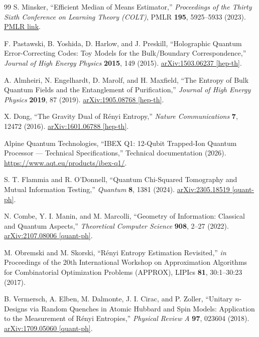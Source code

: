 \documentclass[12pt,a4paper,oneside]{book}
\theoremstyle{plain}
\theoremstyle{definition}
\theoremstyle{remark}
\begin{document}
\begin{thebibliography}{99}
S. Minsker,
``Efficient Median of Means Estimator,''
\emph{Proceedings of the Thirty Sixth Conference on Learning Theory (COLT)}, PMLR \textbf{195}, 5925--5933 (2023).
\href{https://proceedings.mlr.press/v195/minsker23a.html}{PMLR link}.

F. Pastawski, B. Yoshida, D. Harlow, and J. Preskill,
``Holographic Quantum Error-Correcting Codes: Toy Models for the Bulk/Boundary Correspondence,''
\emph{Journal of High Energy Physics} \textbf{2015}, 149 (2015).
\href{https://arxiv.org/abs/1503.06237}{arXiv:1503.06237 [hep-th]}.

A. Almheiri, N. Engelhardt, D. Marolf, and H. Maxfield,
``The Entropy of Bulk Quantum Fields and the Entanglement of Purification,''
\emph{Journal of High Energy Physics} \textbf{2019}, 87 (2019).
\href{https://arxiv.org/abs/1905.08768}{arXiv:1905.08768 [hep-th]}.

X. Dong,
``The Gravity Dual of R\'enyi Entropy,''
\emph{Nature Communications} \textbf{7}, 12472 (2016).
\href{https://arxiv.org/abs/1601.06788}{arXiv:1601.06788 [hep-th]}.

Alpine Quantum Technologies,
``IBEX Q1: 12-Qubit Trapped-Ion Quantum Processor --- Technical Specifications,''
Technical documentation (2026).
\url{https://www.aqt.eu/products/ibex-q1/}.

S. T. Flammia and R. O'Donnell,
``Quantum Chi-Squared Tomography and Mutual Information Testing,''
\emph{Quantum} \textbf{8}, 1381 (2024).
\href{https://arxiv.org/abs/2305.18519}{arXiv:2305.18519 [quant-ph]}.

N. Combe, Y. I. Manin, and M. Marcolli,
``Geometry of Information: Classical and Quantum Aspects,''
\emph{Theoretical Computer Science} \textbf{908}, 2--27 (2022).
\href{https://arxiv.org/abs/2107.08006}{arXiv:2107.08006 [quant-ph]}.

M. Obremski and M. Skorski,
``R\'enyi Entropy Estimation Revisited,''
\emph{in} Proceedings of the 20th International Workshop on Approximation Algorithms for Combinatorial Optimization Problems (APPROX), LIPIcs \textbf{81}, 30:1--30:23 (2017).

B. Vermersch, A. Elben, M. Dalmonte, J. I. Cirac, and P. Zoller,
``Unitary $n$-Designs via Random Quenches in Atomic Hubbard and Spin Models: Application to the Measurement of R\'enyi Entropies,''
\emph{Physical Review A} \textbf{97}, 023604 (2018).
\href{https://arxiv.org/abs/1709.05060}{arXiv:1709.05060 [quant-ph]}.


\end{thebibliography}
\end{document}
